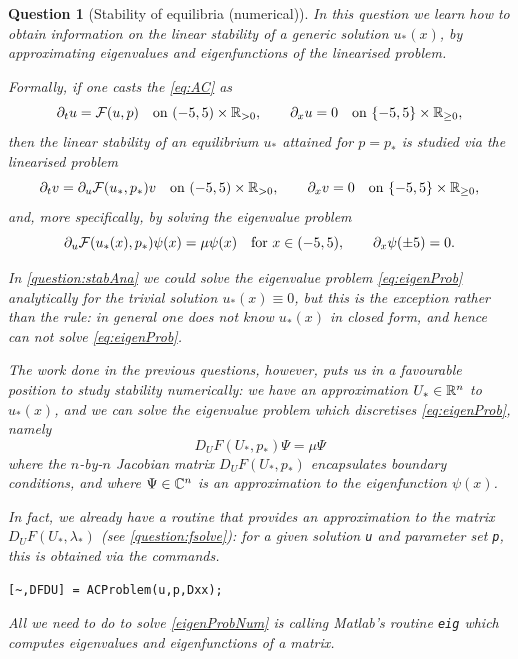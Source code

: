 \documentclass[a4paper]{siamart220329}
\theoremstyle{plain}
\newtheorem{question}{Question}
\begin{document}
\begin{question}[Stability of equilibria (numerical)]
  In this question we learn how to obtain information on the linear stability of a
  generic solution $u_*(x)$, by approximating eigenvalues and eigenfunctions of the
  linearised problem.

  Formally, if one casts the \cref{eq:AC} as
  \[
    \partial_t u = \mathcal{F}(u,p) 
    \quad \textrm{on $(-5,5) \times \mathbb{R}_{>0}$},
    \qquad \partial_x u = 0 \quad \textrm{on $\{-5,5\} \times \mathbb{R}_{\geq 0}$},
  \]
  then the linear stability of an equilibrium $u_*$ attained for $p =
  p_*$ is studied via the linearised problem
  \[
    \partial_t v = \partial_u \mathcal{F}(u_*,p_*) v
    \quad \textrm{on $(-5,5) \times \mathbb{R}_{>0}$},
    \qquad \partial_x v = 0 \quad \textrm{on $\{-5,5\} \times \mathbb{R}_{\geq 0}$},
  \]
  and, more specifically, by solving the eigenvalue problem
  \begin{equation}\label{eq:eigenProb}
    \partial_u \calF(u_*(x),p_*) \psi(x) = \mu \psi(x)
    \quad \textrm{for $x \in (-5,5)$},
    \qquad \partial_x \psi(\pm 5) = 0.
  \end{equation}

  In \cref{question:stabAna} we could solve the eigenvalue problem
  \cref{eq:eigenProb} analytically for the trivial solution $u_*(x) \equiv 0$, but
  this is the exception rather than the rule: in general one does not know $u_*(x)$
  in closed form, and hence can not solve \cref{eq:eigenProb}.

  The work done in the previous questions, however, puts us in a favourable position
  to study
  stability numerically: we have an approximation $U_* \in \mathbb{R}^n$ to
  $u_*(x)$, and we can solve the eigenvalue problem which discretises
  \cref{eq:eigenProb}, namely
  \begin{equation}\label{eigenProbNum}
    D_U F(U_*,p_*) \Psi = \mu \Psi
  \end{equation}
  where the $n$-by-$n$ Jacobian matrix $D_U F(U_*,p_*)$ encapsulates boundary
  conditions, and where $\Psi \in \mathbb{C}^n$ is an approximation to the eigenfunction
  $\psi(x)$.

  In fact,  we already have a routine that provides an approximation to the matrix
  $D_U F(U_*,\lambda_*)$ (see \cref{question:fsolve}): for a given solution
  \lstinline|u| and parameter set \lstinline|p|, this is obtained via the commands.
\begin{lstlisting}[numbers=none]
  [~,DFDU] = ACProblem(u,p,Dxx);
\end{lstlisting}
All we need to do to solve \cref{eigenProbNum} is calling Matlab's routine
\lstinline|eig| which computes eigenvalues and eigenfunctions of a matrix.


\end{question}
\end{document}
